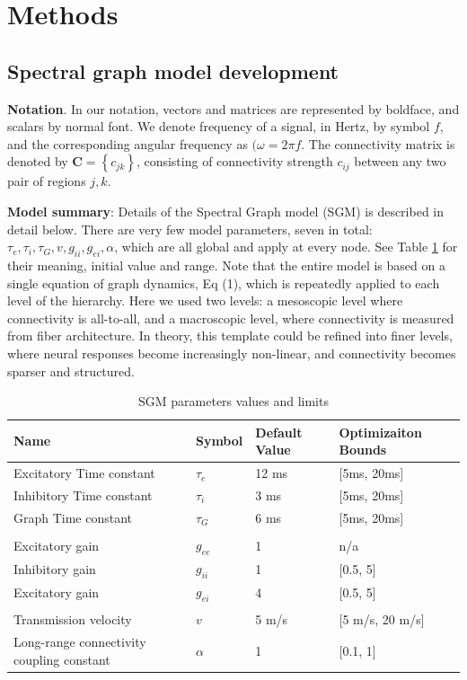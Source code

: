 \section{Methods}

\subsection{Spectral graph model development}
\textbf{Notation}. In our notation, vectors and matrices are
represented by boldface, and scalars by normal font. We denote frequency
of a signal, in Hertz, by symbol $f$, and the corresponding angular
frequency as $(\omega = 2 \pi f$. The connectivity matrix is denoted by
$\mathbf{C} = \left\{ c_{jk} \right\}$, consisting of
connectivity strength $c_{ij}$ between any two pair of regions $j,k$.

\textbf{Model summary}: Details of the Spectral Graph model (SGM) is
described in detail below. There are very few model parameters, seven in
total:
$\tau_{e}, \tau_{i}, \tau_{G}, v, g_{ii}, g_{ei}, \alpha$,
which are all global and apply at every node. See Table \ref{tab:SGM_parameters} for
their meaning, initial value and range. Note that the entire model is
based on a single equation of graph dynamics, Eq (1), which is
repeatedly applied to each level of the hierarchy. Here we used two
levels: a mesoscopic level where connectivity is all-to-all, and a
macroscopic level, where connectivity is measured from fiber
architecture. In theory, this template could be refined into finer
levels, where neural responses become increasingly non-linear, and
connectivity becomes sparser and structured.



\begin{table}
  \caption{SGM parameters values and limits}
  \label{tab:SGM_parameters}
  \centering
 \begin{tabular}{m{14em}|m{2cm}|m{2cm}|m{7em}}
 \hline
 Name & Symbol & Default Value & Optimizaiton Bounds \\
 \hline
 Excitatory Time constant & $ \tau_{e}$ & 12 ms & [5ms, 20ms] \\
 Inhibitory Time constant & $\tau_{i}$ & 3 ms & [5ms, 20ms] \\
 Graph Time constant & $\tau_{G}$ & 6 ms & [5ms, 20ms] \\
 \multicolumn{4}{l}{} \\
 Excitatory gain & $g_{ee}$ & 1 & n/a \\
 Inhibitory gain & $g_{ii}$ & 1 & [0.5, 5] \\
 Excitatory gain & $g_{ei}$ & 4 & [0.5, 5] \\
 \multicolumn{4}{l}{} \\
 Transmission velocity & $v$ & 5 m/s & [5 m/s, 20 m/s] \\
 Long-range connectivity coupling constant & $\alpha$ & 1 & [0.1, 1] \\
 \end{tabular}
\end{table}


